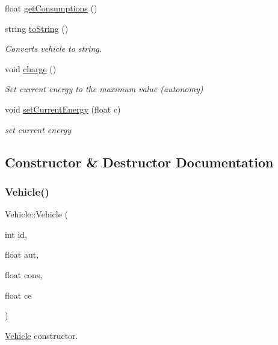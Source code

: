 \begin{DoxyCompactItemize}
$$\item 
float \mbox{\hyperlink{class_vehicle_a8449770d06c218d8168b5f834f4c2feb}{get\+Consumptions}} ()
\item 
string \mbox{\hyperlink{class_vehicle_abd9381537867c1a98430ab06ce51898f}{to\+String}} ()
\begin{DoxyCompactList}\small\item\em Converts vehicle to string. \end{DoxyCompactList}\item 
\mbox{\label{class_vehicle_ab92fc01c6c79b248d31384d5ebf862bd}} 
void \mbox{\hyperlink{class_vehicle_ab92fc01c6c79b248d31384d5ebf862bd}{charge}} ()
\begin{DoxyCompactList}\small\item\em Set current energy to the maximum value (autonomy) \end{DoxyCompactList}\item 
void \mbox{\hyperlink{class_vehicle_acceb523a48842847e13b22ef71798907}{set\+Current\+Energy}} (float c)
\begin{DoxyCompactList}\small\item\em set current energy \end{DoxyCompactList}\end{DoxyCompactItemize}


\subsection{Constructor \& Destructor Documentation}
\mbox{\label{class_vehicle_a4291fb819f4f33fde79d80d3c5112260}} 
\subsubsection{\texorpdfstring{Vehicle()}{Vehicle()}}
{\footnotesize\ttfamily Vehicle\+::\+Vehicle (\begin{DoxyParamCaption}\item[{int}]{id,  }\item[{float}]{aut,  }\item[{float}]{cons,  }\item[{float}]{ce }\end{DoxyParamCaption})}



\mbox{\hyperlink{class_vehicle}{Vehicle}} constructor. 


